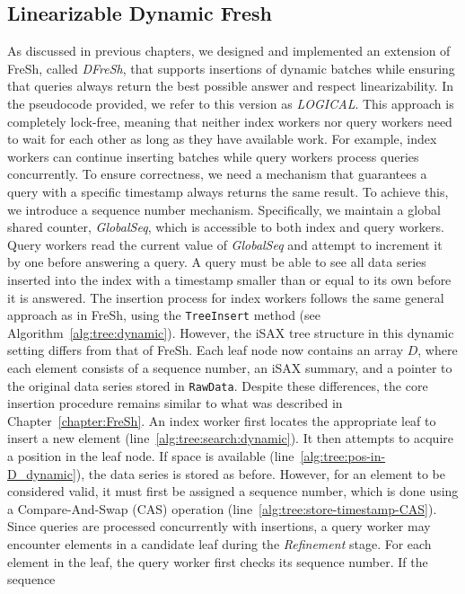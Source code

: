 \documentclass[a4paper,11pt,twoside,openany]{book}
\begin{document}
\subsection{Linearizable Dynamic Fresh}

As discussed in previous chapters, we designed and implemented an extension of FreSh,
called \textit{DFreSh}, that supports insertions of dynamic batches while ensuring that
queries always return the best possible answer and respect linearizability.
In the pseudocode provided, we refer to this version as \textit{LOGICAL}.
This approach is completely lock-free, meaning that neither index workers nor query workers
need to wait for each other as long as they have available work. For example, index workers
can continue inserting batches while query workers process queries concurrently.  
% 
To ensure correctness, we need a mechanism that guarantees a query with a
specific timestamp always returns the same result. To achieve this, we introduce 
a sequence number mechanism. Specifically, we maintain a global shared counter,
\textit{GlobalSeq}, which is accessible to both index and query workers.
Query workers read the current value of \textit{GlobalSeq} and attempt to increment it
by one before answering a query. A query must be able to see all data series inserted
into the index with a timestamp smaller than or equal to its own before it is answered.  
%
The insertion process for index workers follows the same general approach as in FreSh,
using the \texttt{TreeInsert} method (see Algorithm~\ref{alg:tree:dynamic}). However,
the iSAX tree structure in this dynamic setting differs from that of FreSh.
Each leaf node now contains an array \( D \), where each element consists of
a sequence number, an iSAX summary, and a pointer to the original data series stored in
\texttt{RawData}. Despite these differences, the core insertion procedure remains
similar to what was described in Chapter~\ref{chapter:FreSh}.  
An index worker first locates the appropriate leaf to insert a new element
(line~\ref{alg:tree:search:dynamic}). It then attempts to acquire a position in the leaf
node. If space is available (line~\ref{alg:tree:pos-in-D_dynamic}), the data series is
stored as before. However, for an element to be considered valid, it must first be assigned
a sequence number, which is done using a Compare-And-Swap (CAS) operation
(line~\ref{alg:tree:store-timestamp-CAS}).  
Since queries are processed concurrently with insertions, a query worker may
encounter elements in a candidate leaf during the \textit{Refinement} stage. For each
element in the leaf, the query worker first checks its sequence number. If the sequence
\end{document}
